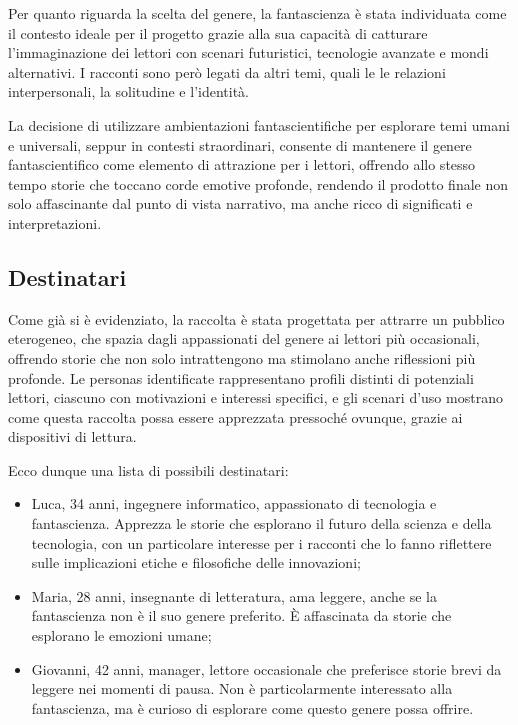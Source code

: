 \documentclass[a4paper,12pt]{article}
\begin{document}
\bigbreak

Per quanto riguarda la scelta del genere, la fantascienza è stata individuata come il contesto ideale per il progetto grazie alla sua capacità di catturare l'immaginazione dei lettori con scenari futuristici, tecnologie avanzate e mondi alternativi. I racconti sono però legati da altri temi, quali le le relazioni interpersonali, la solitudine e l'identità.

\bigbreak

La decisione di utilizzare ambientazioni fantascientifiche per esplorare temi umani e universali, seppur in contesti straordinari, consente di mantenere il genere fantascientifico come elemento di attrazione per i lettori, offrendo allo stesso tempo storie che toccano corde emotive profonde, rendendo il prodotto finale non solo affascinante dal punto di vista narrativo, ma anche ricco di significati e interpretazioni.


\subsection*{Destinatari}


Come già si è evidenziato, la raccolta è stata progettata per attrarre un pubblico eterogeneo, che spazia dagli appassionati del genere ai lettori più occasionali, offrendo storie che non solo intrattengono ma stimolano anche riflessioni più profonde. Le personas identificate rappresentano profili distinti di potenziali lettori, ciascuno con motivazioni e interessi specifici, e gli scenari d'uso mostrano come questa raccolta possa essere apprezzata pressoché ovunque, grazie ai dispositivi di lettura.

Ecco dunque una lista di possibili destinatari:

\begin{itemize}
    \item Luca, 34 anni, ingegnere informatico, appassionato di tecnologia e fantascienza. Apprezza le storie che esplorano il futuro della scienza e della tecnologia, con un particolare interesse per i racconti che lo fanno riflettere sulle implicazioni etiche e filosofiche delle innovazioni;
    \item Maria, 28 anni, insegnante di letteratura, ama leggere, anche se la fantascienza non è il suo genere preferito. È affascinata da storie che esplorano le emozioni umane;
    \item Giovanni, 42 anni, manager, lettore occasionale che preferisce storie brevi da leggere nei momenti di pausa. Non è particolarmente interessato alla fantascienza, ma è curioso di esplorare come questo genere possa offrire.
\end{itemize}
\end{document}
